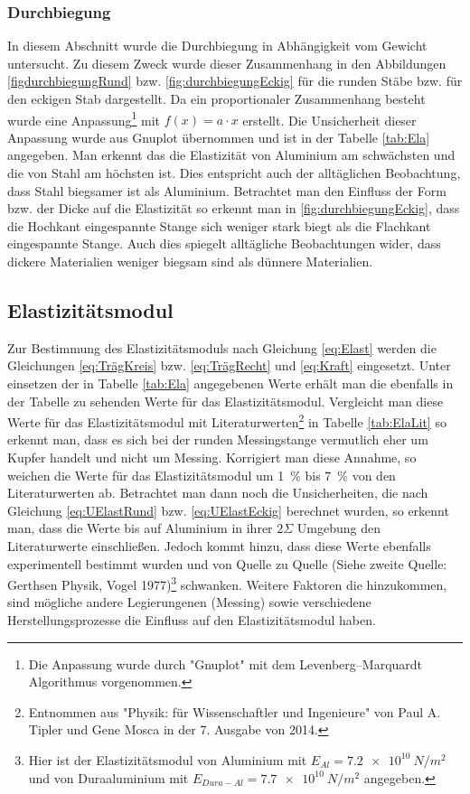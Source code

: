 \subsubsection*{Durchbiegung}
In diesem Abschnitt wurde die Durchbiegung in Abhängigkeit vom Gewicht untersucht. Zu diesem Zweck wurde dieser Zusammenhang in den Abbildungen \ref{figdurchbiegungRund} bzw. \ref{fig:durchbiegungEckig}  für die runden Stäbe bzw. für den eckigen Stab dargestellt. Da ein proportionaler Zusammenhang besteht wurde eine Anpassung\footnote{Die Anpassung wurde durch "Gnuplot" mit dem Levenberg–Marquardt Algorithmus vorgenommen.  }  mit $f(x)=a \cdot x$ erstellt. Die Unsicherheit dieser Anpassung wurde aus Gnuplot übernommen und ist in der Tabelle \ref{tab:Ela} angegeben.
Man erkennt das die Elastizität von Aluminium am schwächsten und die von Stahl am höchsten ist. Dies entspricht auch der alltäglichen Beobachtung, dass Stahl biegsamer ist als Aluminium.
Betrachtet man den Einfluss der Form bzw. der Dicke auf die Elastizität so erkennt man in \ref{fig:durchbiegungEckig}, dass die Hochkant eingespannte Stange sich weniger stark biegt als die Flachkant eingespannte Stange. Auch dies spiegelt alltägliche Beobachtungen wider, dass dickere Materialien weniger biegsam sind als dünnere Materialien.

\subsection{Elastizitätsmodul}


Zur Bestimmung des Elastizitätsmoduls nach Gleichung \ref{eq:Elast} werden die Gleichungen \ref{eq:TrägKreis} bzw. \ref{eq:TrägRecht} und \ref{eq:Kraft} eingesetzt. Unter einsetzen der in Tabelle \ref{tab:Ela} angegebenen Werte erhält man die ebenfalls in der Tabelle zu sehenden Werte für das Elastizitätsmodul.
Vergleicht man diese Werte für das Elastizitätsmodul mit Literaturwerten\footnote{Entnommen aus "Physik: für Wissenschaftler und Ingenieure" von Paul A. Tipler und Gene Mosca in der 7. Ausgabe von 2014.} in Tabelle \ref{tab:ElaLit} so erkennt man, dass es sich bei der runden Messingstange vermutlich eher um Kupfer handelt und nicht um Messing. Korrigiert man diese Annahme, so weichen die Werte für das Elastizitätsmodul um \SI{1}{\percent} bis \SI{7}{\percent} von den Literaturwerten ab. Betrachtet man dann noch die Unsicherheiten, die nach Gleichung \ref{eq:UElastRund} bzw. \ref{eq:UElastEckig} berechnet wurden, so erkennt man, dass die Werte bis auf Aluminium in ihrer $2\Sigma$ Umgebung den Literaturwerte einschließen. Jedoch kommt hinzu, dass diese Werte ebenfalls experimentell bestimmt wurden und von Quelle zu Quelle (Siehe zweite Quelle: Gerthsen Physik, Vogel 1977)\footnote{Hier ist der Elastizitätsmodul von Aluminium mit $E_{Al}=\SI{7,2e10}{N \per m^2}$ und von Duraaluminium mit $E_{Dura-Al}=\SI{7,7e10}{N \per m^2}$ angegeben. } schwanken. Weitere Faktoren die hinzukommen, sind mögliche andere Legierungenen (Messing) sowie verschiedene Herstellungsprozesse die Einfluss auf den Elastizitätsmodul haben. 


